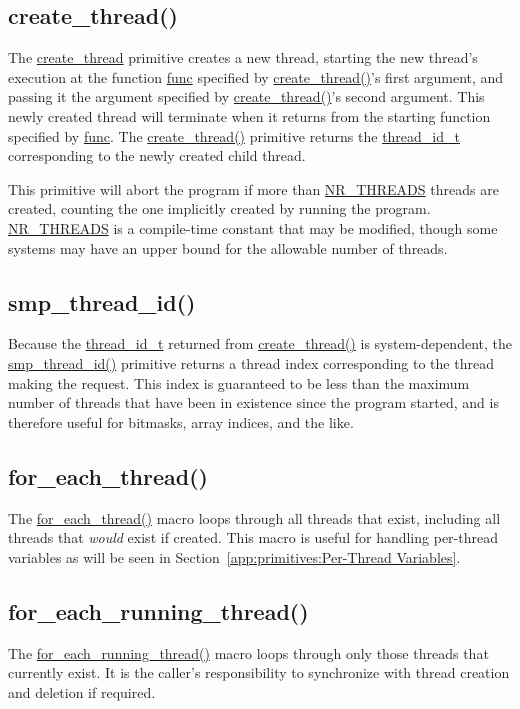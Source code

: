 \subsection{create\_thread()}

The \url{create_thread} primitive creates a new thread,
starting the new thread's execution
at the function \url{func} specified by \url{create_thread()}'s
first argument, and passing it the argument specified by
\url{create_thread()}'s second argument.
This newly created thread will terminate when it returns from the
starting function specified by \url{func}.
The \url{create_thread()} primitive returns the \url{thread_id_t}
corresponding to the newly created child thread.

This primitive will abort the program if more than \url{NR_THREADS}
threads are created, counting the one implicitly created by running
the program.
\url{NR_THREADS} is a compile-time constant that may be modified,
though some systems may have an upper bound for the allowable number
of threads.

\subsection{smp\_thread\_id()}

Because the \url{thread_id_t} returned from \url{create_thread()} is
system-dependent, the \url{smp_thread_id()} primitive returns a thread
index corresponding to the thread making the request.
This index is guaranteed to be less than the maximum number of threads
that have been in existence since the program started,
and is therefore useful for bitmasks, array indices, and
the like.

\subsection{for\_each\_thread()}

The \url{for_each_thread()} macro loops through all threads that exist,
including all threads that \emph{would} exist if created.
This macro is useful for handling per-thread variables as will be
seen in Section~\ref{app:primitives:Per-Thread Variables}.

\subsection{for\_each\_running\_thread()}

The \url{for_each_running_thread()}
macro loops through only those threads that currently exist.
It is the caller's responsibility to synchronize with thread
creation and deletion if required.

